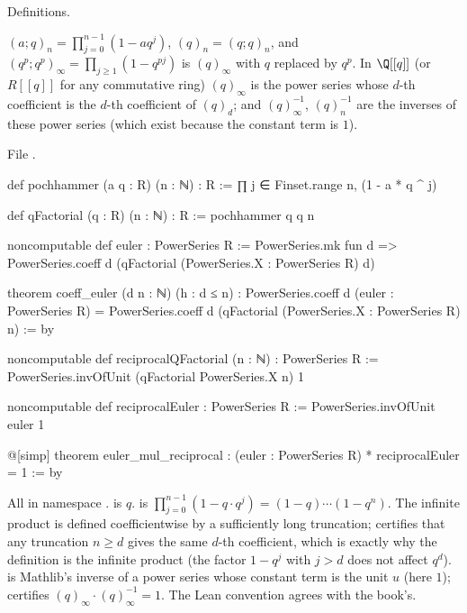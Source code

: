 \begin{status}
Definitions.
\end{status}

\begin{definition}\label{l20:def:euler}
$(a;q)_n=\prod_{j=0}^{n-1}(1-aq^j)$, $(q)_n=(q;q)_n$, and $(q^p;q^p)_\infty=\prod_{j\ge1}(1-q^{pj})$ is $(q)_\infty$
with $q$ replaced by $q^p$. In $\Q[[q]]$ (or $R[[q]]$ for any commutative ring)
$(q)_\infty$ is the power series whose $d$-th coefficient is the $d$-th coefficient of $(q)_d$; and
$(q)_\infty^{-1}$, $(q)_n^{-1}$ are the inverses of these power series (which exist because the constant term
is $1$).
\end{definition}
\noindent File .
\begin{leancode}
def pochhammer (a q : R) (n : ℕ) : R :=
  ∏ j ∈ Finset.range n, (1 - a * q ^ j)

def qFactorial (q : R) (n : ℕ) : R := pochhammer q q n

noncomputable def euler : PowerSeries R :=
  PowerSeries.mk fun d => PowerSeries.coeff d (qFactorial (PowerSeries.X : PowerSeries R) d)

theorem coeff_euler (d n : ℕ) (h : d ≤ n) :
    PowerSeries.coeff d (euler : PowerSeries R) =
      PowerSeries.coeff d (qFactorial (PowerSeries.X : PowerSeries R) n) := by

noncomputable def reciprocalQFactorial (n : ℕ) : PowerSeries R :=
  PowerSeries.invOfUnit (qFactorial PowerSeries.X n) 1

noncomputable def reciprocalEuler : PowerSeries R := PowerSeries.invOfUnit euler 1

@[simp] theorem euler_mul_reciprocal :
    (euler : PowerSeries R) * reciprocalEuler = 1 := by
\end{leancode}

\begin{dictionary}
All in namespace .  is $q$.  is
$\prod_{j=0}^{n-1}(1-q\cdot q^j)=(1-q)\cdots(1-q^n)$. The infinite product is defined
coefficientwise by a sufficiently long truncation;  certifies that any truncation $n\ge d$
gives the same $d$-th coefficient, which is exactly why the definition is the infinite product (the factor
$1-q^{j}$ with $j>d$ does not affect $q^d$).  is Mathlib's inverse of a power
series whose constant term is the unit $u$ (here $1$);  certifies
$(q)_\infty\cdot(q)_\infty^{-1}=1$. The Lean convention agrees with the book's.
\end{dictionary}

